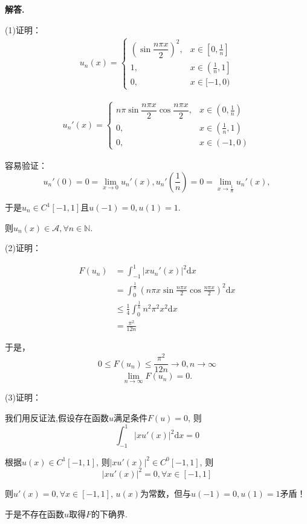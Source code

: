 \documentclass[12pt, a4paper, oneside]{ctexart}
\newenvironment{solution}{\par\noindent\textbf{解答. }}{\par}
\begin{document}
\begin{solution}
\par
(1)证明：
$$
\begin{aligned}
u_n(x)=
\begin{cases}
  \left(\sin \dfrac{n\pi x}{2}\right)^2, &x\in \left[0,\frac{1}{n}\right]\\
  1,         &x \in  \left(\frac{1}{n},1\right]\\
  0,          &x \in [-1,0)
\end{cases}
\end{aligned}
$$

$$
\begin{aligned}
u_n'(x)=
\begin{cases}
  n\pi \sin \dfrac{n\pi x}{2}\cos \dfrac{n\pi x}{2}, &x\in \left(0,\frac{1}{n}\right)\\
  0,         &x \in  \left(\frac{1}{n},1\right)\\
  0,          &x \in (-1,0)
\end{cases}
\end{aligned}
$$
\par
容易验证：
$$
u_n'(0)=0=\lim_{x\to 0}u_n'(x), 
u_n'\left(\frac{1}{n}\right)=0=\lim_{x\to \frac{1}{n}}u_n'(x), 
$$
\par
于是$u_n\in C^1[-1,1]$且$u(-1)=0, u(1)=1$.
\par
则$u_n(x)\in \mathcal{A}, \forall n \in \mathbb{N}$.



\par
(2)证明：
\par
$$
\begin{aligned}
F(u_n)&=\int_{-1}^{1}|xu_n'(x)|^2\mathrm{d}x\\
&=\int_{0}^{\frac{1}{n}}\left(n\pi x\sin \frac{n\pi x}{2}\cos \frac{n\pi x}{2}\right)^2\mathrm{d}x\\
&\leqslant \frac{1}{4}\int_{0}^{\frac{1}{n}}n^2\pi^2x^2\mathrm{d}x\\
&=\frac{\pi^2}{12n}
\end{aligned}
$$
\par
于是，$$
0\leqslant F(u_n)\leqslant \frac{\pi^2}{12n}\to 0, n \to \infty
$$
$$
\lim_{n \to \infty}F(u_n)=0.
$$







\par
(3)证明：
\par
我们用反证法,假设存在函数$u$满足条件$F(u)=0$,
则
$$
\int_{-1}^{1}|xu'(x)|^2\mathrm{d}x=0
$$
\par
根据$u(x)\in C^1[-1,1]$, 则$|xu'(x)|^2\in C^0[-1,1]$,
则
$$
|xu'(x)|^2=0, \forall x \in [-1,1]
$$
\par
则$u'(x)=0, \forall x \in [-1,1]$,
$u(x)$为常数，但与$u(-1)=0, u(1)=1$矛盾！
\par
于是不存在函数$u$取得$F$的下确界.


\end{solution}
\end{document}
